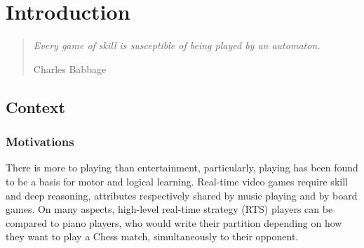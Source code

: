 \chapter{Introduction}

\begin{quotation}
\textit{Every game of skill is susceptible of being played by an automaton.} 
\begin{flushright}Charles Babbage\end{flushright}\end{quotation}



\section{Context}
\subsection{Motivations}



There is more to playing than entertainment, particularly, playing has been found to be a basis for motor and logical learning. Real-time video games require skill and deep reasoning, attributes respectively shared by music playing and by board games. On many aspects, high-level real-time strategy (RTS) players can be compared to piano players, who would write their partition depending on how they want to play a Chess match, simultaneously to their opponent. 


